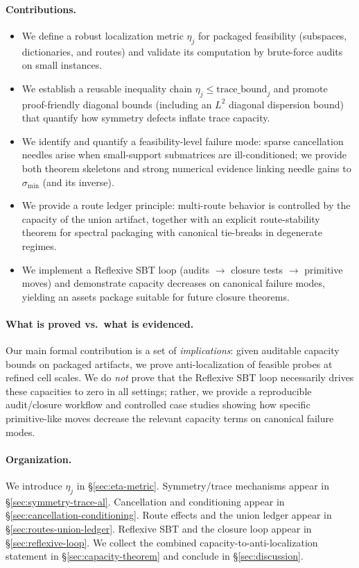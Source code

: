 \documentclass[11pt]{article}
\theoremstyle{plain}
\theoremstyle{definition}
\theoremstyle{remark}
\begin{document}
\paragraph{Contributions.}
\begin{itemize}
  \item We define a robust localization metric \(\eta_j\) for packaged feasibility (subspaces, dictionaries, and routes) and validate its computation by brute-force audits on small instances.
  \item We establish a reusable inequality chain \(\eta_j \le \text{trace\_bound}_j\) and promote proof-friendly diagonal bounds (including an \(L^2\) diagonal dispersion bound) that quantify how symmetry defects inflate trace capacity.
  \item We identify and quantify a feasibility-level failure mode: sparse cancellation needles arise when small-support submatrices are ill-conditioned; we provide both theorem skeletons and strong numerical evidence linking needle gains to \(\sigma_{\min}\) (and its inverse).
  \item We provide a route ledger principle: multi-route behavior is controlled by the capacity of the union artifact, together with an explicit route-stability theorem for spectral packaging with canonical tie-breaks in degenerate regimes.
  \item We implement a Reflexive SBT loop (audits \(\to\) closure tests \(\to\) primitive moves) and demonstrate capacity decreases on canonical failure modes, yielding an assets package suitable for future closure theorems.
\end{itemize}

\paragraph{What is proved vs.\ what is evidenced.}
Our main formal contribution is a set of \emph{implications}: given auditable capacity bounds on packaged artifacts, we prove anti-localization of feasible probes at refined cell scales.
We do \emph{not} prove that the Reflexive SBT loop necessarily drives these capacities to zero in all settings; rather, we provide a reproducible audit/closure workflow and controlled case studies showing how specific primitive-like moves decrease the relevant capacity terms on canonical failure modes.

\paragraph{Organization.}
We introduce \(\eta_j\) in \S\ref{sec:eta-metric}.
Symmetry/trace mechanisms appear in \S\ref{sec:symmetry-trace-al}.
Cancellation and conditioning appear in \S\ref{sec:cancellation-conditioning}.
Route effects and the union ledger appear in \S\ref{sec:routes-union-ledger}.
Reflexive SBT and the closure loop appear in \S\ref{sec:reflexive-loop}.
We collect the combined capacity-to-anti-localization statement in \S\ref{sec:capacity-theorem} and conclude in \S\ref{sec:discussion}.
\end{document}
